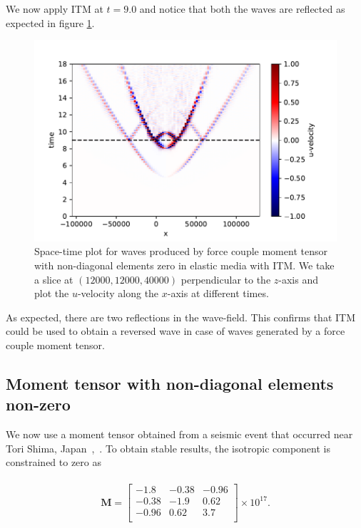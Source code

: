 We now apply \ac{ITM} at $t=9.0$ and notice that both the waves are reflected as expected in figure \ref{fig:space-timeplot-doublecouplediagITM}.

\begin{figure}[htpb]
    \centering
    \includegraphics[width=0.8\linewidth]{figures/double-couple-diag.pdf}
    \caption{Space-time plot for waves produced by force couple moment tensor with non-diagonal elements zero in elastic media with \ac{ITM}. We take a slice at $\left(12000,12000,40000\right)$ perpendicular to the $z$-axis and plot the $u$-velocity along the $x$-axis at different times.}
    \label{fig:space-timeplot-doublecouplediagITM}
\end{figure}
As expected, there are two reflections in the wave-field. This confirms that \ac{ITM} could be used to obtain a reversed wave in case of waves generated by a force couple moment tensor.

\subsection{Moment tensor with non-diagonal elements non-zero}
We now use a moment tensor obtained from a seismic event that occurred near Tori Shima, Japan~\parencite{kanamori},~\parencite{shearer_2019}. 
To obtain stable results, the isotropic component is constrained to zero as

\begin{align}
    \begin{split}
        \mathbf{M} =
            \begin{bmatrix}
                -1.8 & -0.38 & -0.96 \\
                -0.38 & -1.9 & 0.62 \\
                -0.96 & 0.62 & 3.7 \\
            \end{bmatrix} \times 10^{17} .
    \end{split}
\end{align}

